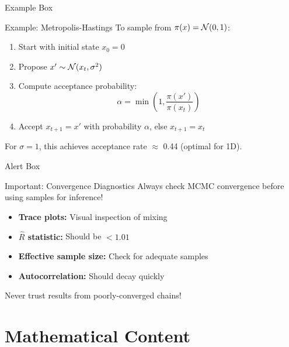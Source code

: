 \documentclass[aspectratio=169]{beamer}
\begin{document}
\begin{frame}{Example Box}
  \begin{examplebox}{Example: Metropolis-Hastings}
    To sample from $\pi(x) = \mathcal{N}(0, 1)$:

    \begin{enumerate}
      \item Start with initial state $x_0 = 0$
      \item Propose $x' \sim \mathcal{N}(x_t, \sigma^2)$
      \item Compute acceptance probability:
      $$\alpha = \min\left(1, \frac{\pi(x')}{\pi(x_t)}\right)$$
      \item Accept $x_{t+1} = x'$ with probability $\alpha$, else $x_{t+1} = x_t$
    \end{enumerate}
  \end{examplebox}

  For $\sigma = 1$, this achieves acceptance rate $\approx$ 0.44 (optimal for 1D).
\end{frame}

\begin{frame}{Alert Box}
  \begin{alertbox}{Important: Convergence Diagnostics}
    Always check MCMC convergence before using samples for inference!

    \begin{itemize}
      \item \textbf{Trace plots:} Visual inspection of mixing
      \item \textbf{$\hat{R}$ statistic:} Should be $< 1.01$
      \item \textbf{Effective sample size:} Check for adequate samples
      \item \textbf{Autocorrelation:} Should decay quickly
    \end{itemize}
  \end{alertbox}

  \vspace{0.5em}

  \alert{Never trust results from poorly-converged chains!}
\end{frame}

\section{Mathematical Content}
\end{document}
